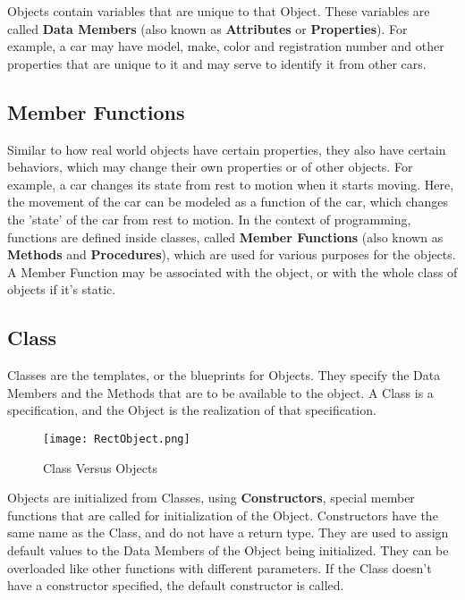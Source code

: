 \documentclass[11pt,fleqn]{book} %
\begin{document}
Objects contain variables that are unique to that Object. These variables are called \textbf{Data Members} (also known as \textbf{Attributes} or 
\textbf{Properties}). For example, a car may have model, make, color and registration number and other properties that are unique to it and may serve to identify it from other cars.


\subsection{Member Functions}

Similar to how real world objects have certain properties, they also have certain behaviors, which may change their own properties or of other objects. For example, a car changes its state from rest to motion when it starts moving. Here, the movement of the car can be modeled as a function of the car, which changes the 'state' of the car from rest to motion.
In the context of programming, functions are defined inside classes, called \textbf{Member Functions} (also known as \textbf{Methods} and \textbf{Procedures}), which are used for various purposes for the objects. A Member Function may be associated with the object, or with the whole class of objects if it's static. 

\subsection{Class}

Classes are the templates, or the blueprints for Objects. They specify the Data Members and the Methods that are to be available to the object. A Class is a specification, and the Object is the realization of that specification.

\begin{figure}[ht]
  \centering
  \texttt{[image: RectObject.png]}
  \caption{Class Versus Objects}
  \label{fig:my_label}
\end{figure}

Objects are initialized from Classes, using \textbf{Constructors}, special member functions that are called for initialization of the Object. Constructors have the same name as the Class, and do not have a return type. They are used to assign default values to the Data Members of the Object being initialized. They can be overloaded like other functions with different parameters. If the Class doesn't have a constructor specified, the default constructor is called.
\end{document}
